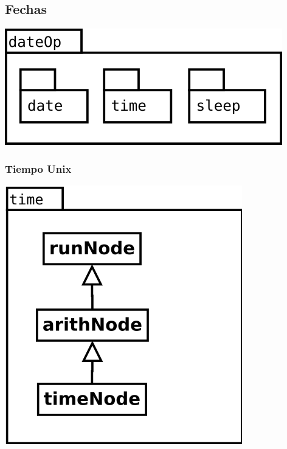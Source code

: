 \begin{multicols}{2}
\subsection {Fechas}
   \begin{center}
   \includegraphics[scale=0.4]{dateOp-package.png} \\
   \end{center}
   \subsubsection {Tiempo Unix} 
   \begin{center}
   \includegraphics[scale=0.4]{time.png} \\
   \end{center}
\columnbreak

\end{multicols}
